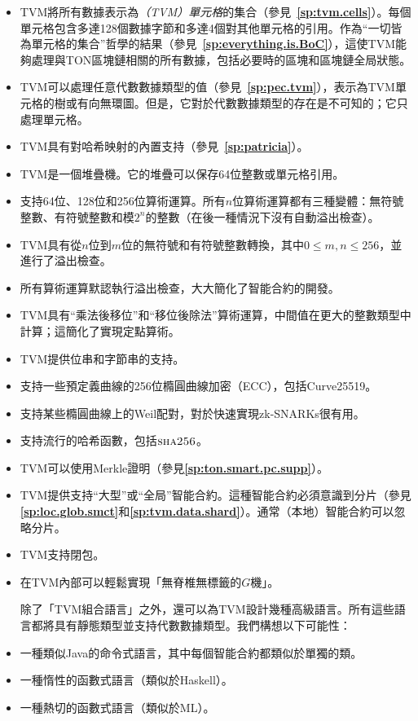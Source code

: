 \documentclass[12pt,oneside]{article}
\def\refpoint#1{{\rm\textbf{\ref{#1}}}}
\let\ptref=\refpoint
\def\opsc#1{\operatorname{\textsc{#1}}}
\def\Sha{\opsc{sha256}}
\begin{document}
\begin{itemize}
\item TVM將所有數據表示為{\em（TVM）單元格}的集合（參見~\ptref{sp:tvm.cells}）。每個單元格包含多達128個數據字節和多達4個對其他單元格的引用。作為“一切皆為單元格的集合”哲學的結果（參見~\ptref{sp:everything.is.BoC}），這使TVM能夠處理與TON區塊鏈相關的所有數據，包括必要時的區塊和區塊鏈全局狀態。
\item TVM可以處理任意代數數據類型的值（參見~\ptref{sp:pec.tvm}），表示為TVM單元格的樹或有向無環圖。但是，它對於代數數據類型的存在是不可知的；它只處理單元格。
\item TVM具有對哈希映射的內置支持（參見~\ptref{sp:patricia}）。
\item TVM是一個堆疊機。它的堆疊可以保存64位整數或單元格引用。
\item 支持64位、128位和256位算術運算。所有$n$位算術運算都有三種變體：無符號整數、有符號整數和模$2^n$的整數（在後一種情況下沒有自動溢出檢查）。
\item TVM具有從$n$位到$m$位的無符號和有符號整數轉換，其中$0\leq m,n\leq 256$，並進行了溢出檢查。
\item 所有算術運算默認執行溢出檢查，大大簡化了智能合約的開發。
\item TVM具有“乘法後移位”和“移位後除法”算術運算，中間值在更大的整數類型中計算；這簡化了實現定點算術。
\item TVM提供位串和字節串的支持。
\item 支持一些預定義曲線的256位橢圓曲線加密（ECC），包括Curve25519。
\item 支持某些橢圓曲線上的Weil配對，對於快速實現zk-SNARKs很有用。
\item 支持流行的哈希函數，包括$\Sha$。
\item TVM可以使用Merkle證明（參見\ptref{sp:ton.smart.pc.supp}）。
\item TVM提供支持“大型”或“全局”智能合約。這種智能合約必須意識到分片（參見\ptref{sp:loc.glob.smct}和\ptref{sp:tvm.data.shard}）。通常（本地）智能合約可以忽略分片。
\item TVM支持閉包。
\item 在TVM內部可以輕鬆實現「無脊椎無標籤的$G$機」\cite{STGM}。

除了「TVM組合語言」之外，還可以為TVM設計幾種高級語言。所有這些語言都將具有靜態類型並支持代數數據類型。我們構想以下可能性：
\item 一種類似Java的命令式語言，其中每個智能合約都類似於單獨的類。
\item 一種惰性的函數式語言（類似於Haskell）。
\item 一種熱切的函數式語言（類似於ML）。
\end{itemize}
 
\end{document}

